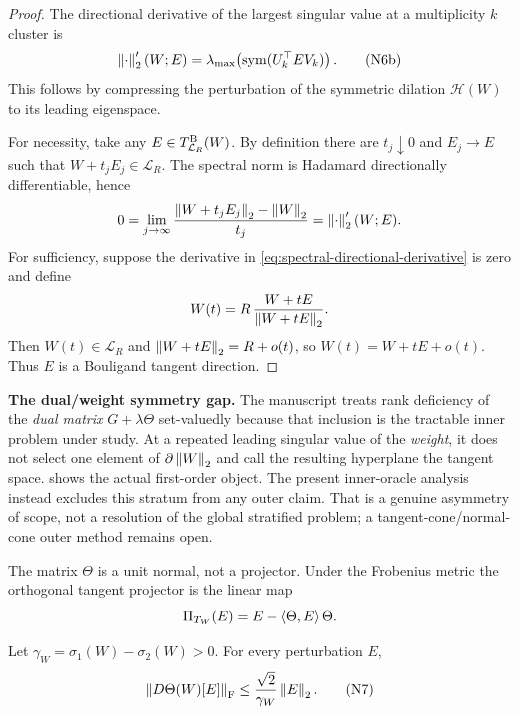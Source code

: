 \begin{proof}
The directional derivative of the largest singular value at a multiplicity
\(k\) cluster is
\[
 \left\lVert \cdot\right\rVert_{2}'(W;E)
 =
 \lambda_{\max}\!\left(
 \operatorname{sym}(U_k^\top E V_k)
 \right).
\tag{N6b}
\label{eq:spectral-directional-derivative}
\]
This follows by compressing the perturbation of the symmetric dilation
\(\mathcal H(W)\) to its leading eigenspace.

For necessity, take any \(E\in T_{\mathcal L_R}^{\rm B}(W)\).  By definition
there are \(t_j\downarrow0\) and \(E_j\to E\) such that
\(W+t_jE_j\in\mathcal L_R\).  The spectral norm is Hadamard directionally
differentiable, hence
\[
 0
 =
 \lim_{j\to\infty}
 \frac{\left\lVert W+t_jE_j\right\rVert_{2}-\left\lVert W\right\rVert_{2}}{t_j}
 =
 \left\lVert \cdot\right\rVert_{2}'(W;E).
\]
For sufficiency, suppose the derivative in
\eqref{eq:spectral-directional-derivative} is zero and define
\[
 W(t)=R\,\frac{W+tE}{\left\lVert W+tE\right\rVert_{2}}.
\]
Then \(W(t)\in\mathcal L_R\) and
\(\left\lVert W+tE\right\rVert_{2}=R+o(t)\), so
\(W(t)=W+tE+o(t)\).  Thus \(E\) is a Bouligand tangent direction.
\end{proof}

\begin{boundary}
\textbf{The dual/weight symmetry gap.}
The manuscript treats rank deficiency of the \emph{dual matrix}
\(G+\lambda\Theta\) set-valuedly because that inclusion is the tractable inner
problem under study.  At a repeated leading singular value of the
\emph{weight}, it does not select one element of
\(\partial\left\lVert W\right\rVert_{2}\) and call the resulting hyperplane the tangent space.
 shows the actual first-order object.
The present inner-oracle analysis instead excludes this stratum from any
outer claim.  That is a genuine asymmetry of scope, not a resolution of the
global stratified problem; a tangent-cone/normal-cone outer method remains
open.
\end{boundary}

\begin{remark}
The matrix \(\Theta\) is a unit normal, not a projector.  Under the Frobenius metric the
orthogonal tangent projector is the linear map
\[
 \Pi_{T_W}(E)=E-\left\langle \Theta,E\right\rangle\Theta.
\]
\end{remark}

\begin{lemma}
\label{lem:normal-derivative}
Let \(\gamma_W=\sigma_1(W)-\sigma_2(W)>0\).  For every perturbation \(E\),
\[
 \left\lVert D\Theta(W)[E]\right\rVert_{\mathrm F}
 \le
 \frac{\sqrt2}{\gamma_W}\left\lVert E\right\rVert_{2}.
\tag{N7}
\label{eq:normal-derivative}
\]
\end{lemma}

